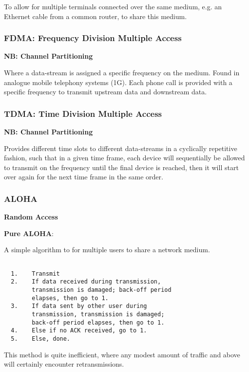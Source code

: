 \documentclass{article}
\begin{document}
To allow for multiple terminals connected over the same medium, e.g. an Ethernet cable from a common router, to share this medium.

\subsubsection{FDMA: Frequency Division Multiple Access}

\textbf{NB: Channel Partitioning}

Where a data-stream is assigned a specific frequency on the medium. Found in analogue mobile telephony systems (1G). Each phone call is provided with a specific frequency to transmit upstream data and downstream data.

\subsubsection{TDMA: Time Division Multiple Access}

\textbf{NB: Channel Partitioning}

Provides different time slots to different data-streams in a cyclically repetitive fashion, such that in a given time frame, each device will sequentially be allowed to transmit on the frequency until the final device is reached, then it will start over again for the next time frame in the same order.
\filbreak
\subsubsection{ALOHA}

\textbf{Random Access}

\textbf{Pure ALOHA}:

A simple algorithm to for multiple users to share a network medium.

\begin{lstlisting}

  1.    Transmit
  2.    If data received during transmission, 
        transmission is damaged; back-off period
        elapses, then go to 1.
  3.    If data sent by other user during
        transmission, transmission is damaged;
        back-off period elapses, then go to 1.
  4.    Else if no ACK received, go to 1.
  5.    Else, done.

\end{lstlisting}

This method is quite inefficient, where any modest amount of traffic and above will certainly encounter retransmissions.
\end{document}
